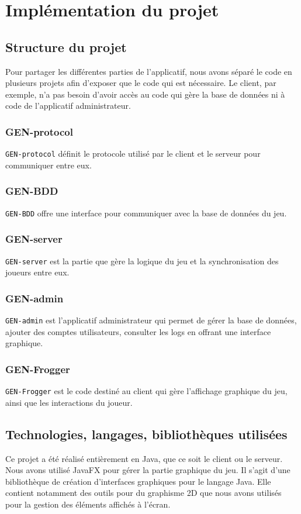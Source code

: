 \documentclass[a4paper,12pt]{article}
\begin{document}
	\section{Implémentation du projet}
	
	
	\subsection{Structure du projet}
	Pour partager les différentes parties de l'applicatif, nous avons séparé le code en plusieurs projets afin d'exposer que le code qui est nécessaire. Le client, par exemple, n'a pas besoin d'avoir accès au code qui gère la base de données ni à code de l'applicatif administrateur.
	
	\subsubsection{GEN-protocol}
	\texttt{GEN-protocol} définit le protocole utilisé par le client et le serveur pour communiquer entre eux.
	\subsubsection{GEN-BDD}
	\texttt{GEN-BDD} offre une interface pour communiquer avec la base de données du jeu.
	\subsubsection{GEN-server}
	\texttt{GEN-server} est la partie que gère la logique du jeu et la synchronisation des joueurs entre eux.
	\subsubsection{GEN-admin}
	\texttt{GEN-admin} est l'applicatif administrateur qui permet de gérer la base de données, ajouter des comptes utilisateurs, consulter les logs en offrant une interface graphique.
	\subsubsection{GEN-Frogger}
	\texttt{GEN-Frogger} est le code destiné au client qui gère l'affichage graphique du jeu, ainsi que les interactions du joueur.
	
	
	\subsection{Technologies, langages, bibliothèques utilisées}
	Ce projet a été réalisé entièrement en Java, que ce soit le client ou le serveur.
	Nous avons utilisé JavaFX pour gérer la partie graphique du jeu. Il s'agit d'une bibliothèque de création d'interfaces graphiques pour le langage Java. Elle contient notamment des outils pour du graphisme 2D que nous avons utilisés pour la gestion des éléments affichés à l'écran. \\
	
\end{document}
